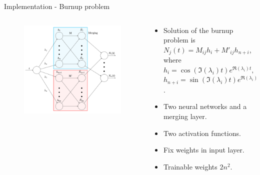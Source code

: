 \documentclass[9pt]{beamer}
\begin{document}
\begin{frame}[fragile]{Implementation - Burnup problem}
\begin{columns}[M] %
\begin{column}{0.55\textwidth} %
\begin{figure}
\includegraphics[width=\textwidth]{Screenshot 2023-05-21 at 14.28.14.png}
\end{figure}
\end{column}
\begin{column}{0.45\textwidth} %
\begin{itemize}
\item Solution of the burnup problem is $N_j(t) = M_{ij} h_i + M'_{ij} h_{n+i}$, where $h_i = \cos(\Im(\lambda_i) t) e^{\Re(\lambda_i) t},$ $h_{n+i} = \sin(\Im(\lambda_i) t) e^{\Re(\lambda_i) t}$.
\item Two neural networks and a merging layer.
\item Two activation functions.
\item Fix weights in input layer.
\item Trainable weights $2n^2$.
\end{itemize}
\end{column}
\end{columns}
\end{frame}
\end{document}
